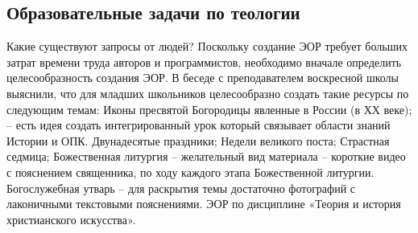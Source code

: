 \subsection{Образовательные задачи по теологии}


Какие существуют запросы от людей?
Поскольку создание ЭОР требует больших затрат времени труда авторов и программистов, необходимо вначале определить целесообразность создания ЭОР. В беседе с преподавателем воскресной школы выяснили, что для младших школьников целесообразно создать такие ресурсы по следующим темам:
Иконы пресвятой Богородицы явленные в России (в ХХ веке); – есть идея создать интегрированный урок который связывает области знаний Истории и ОПК.
Двунадесятые праздники;
Недели великого поста;
Страстная седмица;
Божественная литургия – желательный вид материала – короткие видео с пояснением священника, по ходу каждого этапа Божественной литургии.
Богослужебная утварь – для раскрытия темы достаточно фотографий с лаконичными текстовыми пояснениями.
ЭОР по дисциплине «Теория и история христианского искусства».